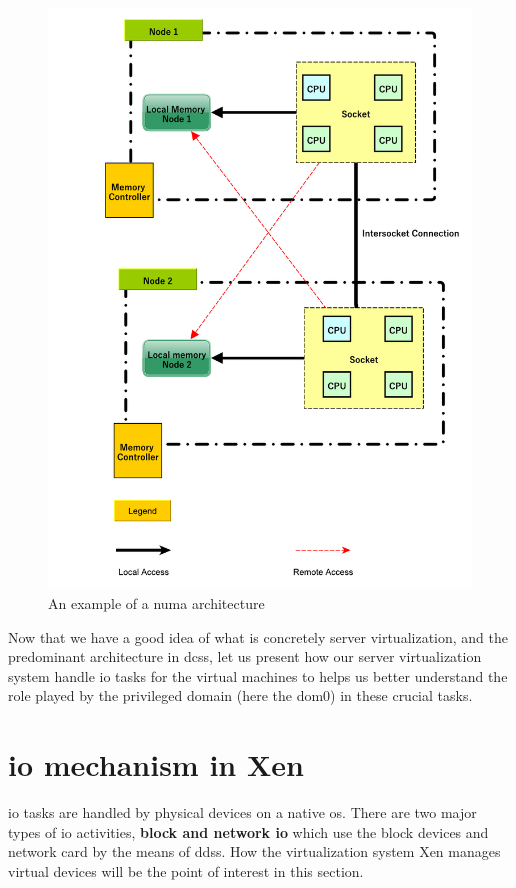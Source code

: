 \begin{figure}
    \centering
    \includegraphics[scale=0.40]{fig02/numa-architecture.pdf}
    \caption{An example of a numa architecture}
    \label{fig:numa_architecture}
\end{figure}

\par Now that we have a good idea of what is concretely server virtualization, and the predominant architecture in \glspl{dc}s, let us present how our server virtualization system handle \acrshort{io} tasks for the virtual machines to helps us better understand the role played by the privileged domain (here the dom0) in these crucial tasks.

\section{\acrshort{io} mechanism in Xen}
\acrshort{io} tasks are handled by physical devices on a native \acrshort{os}. There are two major types of \acrshort{io} activities, \textbf{block and network \acrshort{io}} which use the block devices and network card by the means of \glspl{dd}s. How the virtualization system Xen manages virtual devices will be the point of interest in this section.


